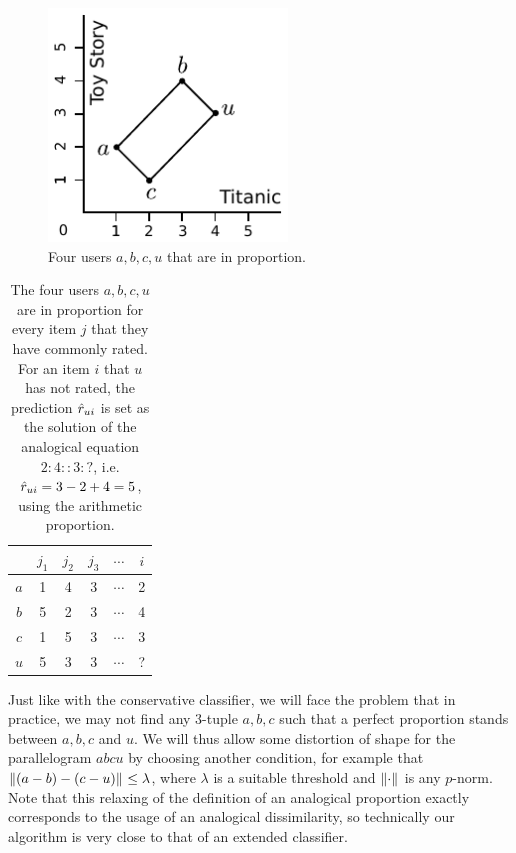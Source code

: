 \begin{figure}[!h]
\centering
  \includegraphics[width=2.5in]{figures/analogical_recommendation.pdf}
  \caption{Four users $a, b, c, u$ that are in proportion.}
\label{FIG:analogical_recommendation}
\end{figure}

\begin{table}[h!]
\centering
  \begin{tabular}{ c   c  c  c  c  c  }
\toprule
 & $j_1$ & $j_2$ & $j_3$ & $\cdots$ & $i$\\
  \midrule
$a$ & 1 & 4  & 3 & $\cdots$ & 2 \\
$b$ & 5 & 2  & 3 & $\cdots$ & 4 \\
$c$ & 1 & 5  & 3 & $\cdots$ & 3 \\
$u$ & 5 & 3  & 3 & $\cdots$ & ? \\
\bottomrule
\end{tabular}
\caption{The four users $a, b, c, u$ are in proportion for every item $j$ that
  they have commonly rated. For an item $i$ that $u$ has not rated, the
  prediction $\hat{r}_{ui}$ is set as the solution of the analogical equation
  $2:4::3:?$, i.e. $\hat{r}_{ui} = 3 - 2 + 4 = 5$, using the arithmetic proportion.}
\label{TAB:analogical_recommendation}
\end{table}

Just like with the conservative classifier, we will face the problem that in
practice, we may not find any $3$-tuple $a, b, c$ such that a perfect
proportion stands between $a, b, c$ and $u$. We will thus allow some distortion
of shape for the parallelogram $abcu$ by choosing another condition, for
example that ${\left\lVert(a-b) - (c-u)\right\rVert}_{} \leq \lambda$, where $\lambda$ is a
suitable threshold and ${\left\lVert\cdot\right\rVert}_{}$ is any $p$-norm. Note that this
relaxing of the definition of an analogical proportion exactly corresponds to
the usage of an analogical dissimilarity, so technically our algorithm is very
close to that of an extended classifier.

